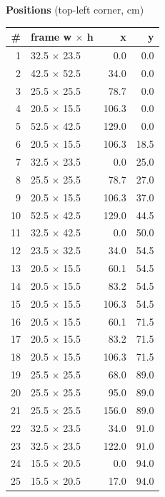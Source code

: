 \documentclass[a4paper,landscape,10pt]{article}
\begin{document}
\begin{minipage}[t]{0.25\textwidth}
\vspace{8pt}
{\bfseries Positions} (top-left corner, cm)\\[2pt]
\tiny
\begin{tabular}{@{}r l r r@{}}
\toprule
\# & frame w $\times$ h & x & y \\
\midrule
1 & 32.5 $\times$ 23.5 & 0.0 & 0.0 \\
2 & 42.5 $\times$ 52.5 & 34.0 & 0.0 \\
3 & 25.5 $\times$ 25.5 & 78.7 & 0.0 \\
4 & 20.5 $\times$ 15.5 & 106.3 & 0.0 \\
5 & 52.5 $\times$ 42.5 & 129.0 & 0.0 \\
6 & 20.5 $\times$ 15.5 & 106.3 & 18.5 \\
7 & 32.5 $\times$ 23.5 & 0.0 & 25.0 \\
8 & 25.5 $\times$ 25.5 & 78.7 & 27.0 \\
9 & 20.5 $\times$ 15.5 & 106.3 & 37.0 \\
10 & 52.5 $\times$ 42.5 & 129.0 & 44.5 \\
11 & 32.5 $\times$ 42.5 & 0.0 & 50.0 \\
12 & 23.5 $\times$ 32.5 & 34.0 & 54.5 \\
13 & 20.5 $\times$ 15.5 & 60.1 & 54.5 \\
14 & 20.5 $\times$ 15.5 & 83.2 & 54.5 \\
15 & 20.5 $\times$ 15.5 & 106.3 & 54.5 \\
16 & 20.5 $\times$ 15.5 & 60.1 & 71.5 \\
17 & 20.5 $\times$ 15.5 & 83.2 & 71.5 \\
18 & 20.5 $\times$ 15.5 & 106.3 & 71.5 \\
19 & 25.5 $\times$ 25.5 & 68.0 & 89.0 \\
20 & 25.5 $\times$ 25.5 & 95.0 & 89.0 \\
21 & 25.5 $\times$ 25.5 & 156.0 & 89.0 \\
22 & 32.5 $\times$ 23.5 & 34.0 & 91.0 \\
23 & 32.5 $\times$ 23.5 & 122.0 & 91.0 \\
24 & 15.5 $\times$ 20.5 & 0.0 & 94.0 \\
25 & 15.5 $\times$ 20.5 & 17.0 & 94.0 \\
\bottomrule
\end{tabular}
\end{minipage}
\clearpage
\end{document}
